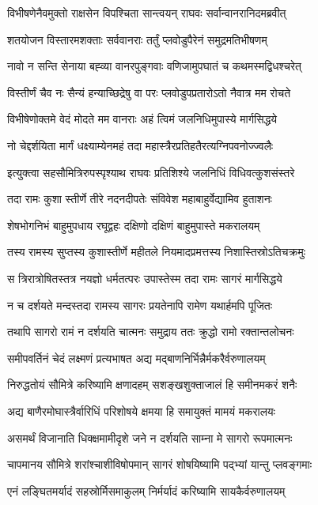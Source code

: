 \twolineshloka
{विभीषणेनैवमुक्तो राक्षसेन विपश्चिता}
{सान्त्वयन् राघवः सर्वान्वानरानिदमब्रवीत्}%

\twolineshloka
{शतयोजन विस्तारमशक्ताः सर्ववानराः}
{तर्तुं प्लवोडुपैरेनं समुद्रमतिभीषणम्}%

\twolineshloka
{नावो न सन्ति सेनाया बह्व्या वानरपुङ्गवाः}
{वणिजामुपघातं च कथमस्मद्विधश्चरेत्}%

\twolineshloka
{विस्तीर्णं चैव नः सैन्यं हन्याच्छिद्रेषु वा परः}
{प्लवोडुपप्रतारोऽतो नैवात्र मम रोचते}%

\twolineshloka
{विभीषेणोक्तमे वेदं मोदते मम वानराः}
{अहं त्विमं जलनिधिमुपास्ये मार्गसिद्धये}%

\twolineshloka
{नो चेद्दर्शयिता मार्गं धक्ष्याम्येनमहं तदा}
{महास्त्रैरप्रतिहतैरत्यग्निपवनोज्ज्वलैः}%

\twolineshloka
{इत्युक्त्वा सहसौमित्रिरुपस्पृश्याथ राघवः}
{प्रतिशिश्ये जलनिधिं विधिवत्कुशसंस्तरे}%

\twolineshloka
{तदा रामः कुशा स्तीर्णे तीरे नदनदीपतेः}
{संविवेश महाबाहुर्वेद्यामिव हुताशनः}%

\twolineshloka
{शेषभोगनिभं बाहुमुपधाय रघूद्वहः}
{दक्षिणो दक्षिणं बाहुमुपास्ते मकरालयम्}%

\twolineshloka
{तस्य रामस्य सुप्तस्य कुशास्तीर्णे महीतले}
{नियमादप्रमत्तस्य निशास्तिस्रोऽतिचक्रमुः}%

\twolineshloka
{स त्रिरात्रोषितस्तत्र नयज्ञो धर्मतत्परः}
{उपास्तेस्म तदा रामः सागरं मार्गसिद्धये}%

\twolineshloka
{न च दर्शयते मन्दस्तदा रामस्य सागरः}
{प्रयतेनापि रामेण यथार्हमपि पूजितः}%

\twolineshloka
{तथापि सागरो रामं न दर्शयति चात्मनः}
{समुद्राय ततः क्रुद्धो रामो रक्तान्तलोचनः}%

\twolineshloka
{समीपवर्तिनं चेदं लक्ष्मणं प्रत्यभाषत}
{अद्य मद्बाणनिर्भिन्नैर्मकरैर्वरुणालयम्}%

\twolineshloka
{निरुद्धतोयं सौमित्रे करिष्यामि क्षणादहम्}
{सशङ्खशुक्ताजालं हि समीनमकरं शनैः}%

\twolineshloka
{अद्य बाणैरमोघास्त्रैर्वारिधिं परिशोषये}
{क्षमया हि समायुक्तं मामयं मकरालयः}%

\twolineshloka
{असमर्थं विजानाति धिक्क्षमामीदृशे जने}
{न दर्शयति साम्ना मे सागरो रूपमात्मनः}%

\twolineshloka
{चापमानय सौमित्रे शरांश्चाशीविषोपमान्}
{सागरं शोषयिष्यामि पद्भ्यां यान्तु प्लवङ्गमाः}%

\twolineshloka
{एनं लङ्घितमर्यादं सहस्रोर्मिसमाकुलम्}
{निर्मर्यादं करिष्यामि सायकैर्वरुणालयम्}%

